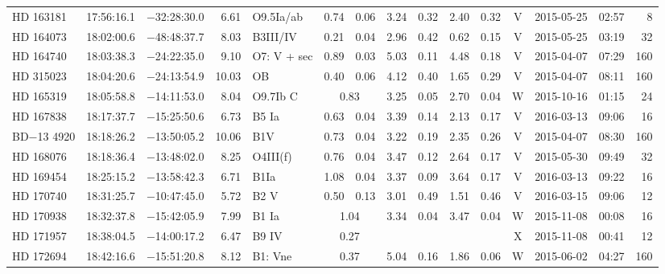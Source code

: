 \begin{tiny}
\begin{longtable}{lrrrll@{$\,\pm$\,}rl@{$\,\pm$\,}rl@{$\,\pm$\,}rcrrr}
HD 163181     &17:56:16.1&  $-$32:28:30.0&        6.61&  O9.5Ia/ab      & 0.74 & 0.06   &    3.24 & 0.32 &      2.40 & 0.32 &    V  &2015-05-25 &02:57&    8\\  %
HD 164073     &18:02:00.6&  $-$48:48:37.7&        8.03&  B3III/IV       & 0.21 & 0.04   &    2.96 & 0.42 &      0.62 & 0.15 &    V  &2015-05-25 &03:19&   32\\  %
HD 164740     &18:03:38.3&  $-$24:22:35.0&        9.10&  O7: V + sec    & 0.89 & 0.03   &    5.03 & 0.11 &      4.48 & 0.18 &    V  &2015-04-07 &07:29&  160\\  %
HD 315023     &18:04:20.6&  $-$24:13:54.9&       10.03&  OB             & 0.40 & 0.06   &    4.12 & 0.40 &      1.65 & 0.29 &    V  &2015-04-07 &08:11&  160\\  %
HD 165319     &18:05:58.8&  $-$14:11:53.0&        8.04&  O9.7Ib C &\multicolumn{2}{c}{0.83} &3.25 & 0.05 &      2.70 & 0.04 &    W  &2015-10-16 &01:15&   24\\  %
HD 167838     &18:17:37.7&  $-$15:25:50.6&        6.73&  B5 Ia          & 0.63 & 0.04   &    3.39 & 0.14 &      2.13 & 0.17 &    V  &2016-03-13 &09:06&   16\\  %
BD$-$13 4920  &18:18:26.2&  $-$13:50:05.2&       10.06&  B1V            & 0.73 & 0.04   &    3.22 & 0.19 &      2.35 & 0.26 &    V  &2015-04-07 &08:30&  160\\  %
HD 168076     &18:18:36.4&  $-$13:48:02.0&        8.25&  O4III(f)       & 0.76 & 0.04   &    3.47 & 0.12 &      2.64 & 0.17 &    V  &2015-05-30 &09:49&   32\\  %
HD 169454     &18:25:15.2&  $-$13:58:42.3&        6.71&  B1Ia           & 1.08 & 0.04   &    3.37 & 0.09 &      3.64 & 0.17 &    V  &2016-03-13 &09:22&   16\\  %
HD 170740     &18:31:25.7&  $-$10:47:45.0&        5.72&  B2 V           & 0.50 & 0.13   &    3.01 & 0.49 &      1.51 & 0.46 &    V  &2016-03-15 &09:06&   12\\  %
HD 170938     &18:32:37.8&  $-$15:42:05.9&        7.99&  B1 Ia &\multicolumn{2}{c}{1.04}&    3.34 & 0.04 &      3.47 & 0.04 &    W  &2015-11-08 &00:08&   16\\  %
HD 171957     &18:38:04.5&  $-$14:00:17.2&        6.47&  B9 IV &\multicolumn{2}{c}{0.27} &\multicolumn{2}{c}{}&\multicolumn{2}{c}{}& X  &2015-11-08 &00:41&   12\\  %
HD 172694     &18:42:16.6&  $-$15:51:20.8&        8.12&  B1: Vne&\multicolumn{2}{c}{0.37}&   5.04 & 0.16 &      1.86 & 0.06 &    W  &2015-06-02 &04:27&  160\\  %

\end{longtable}
\end{tiny}
